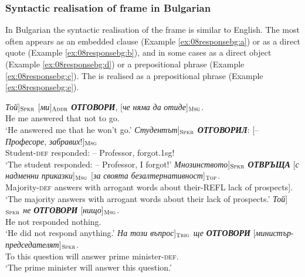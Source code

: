 \documentclass[output=paper,colorlinks,citecolor=brown]{langscibook}
\begin{document}
\subsubsection{Syntactic realisation of  frame in Bulgarian}

In Bulgarian the syntactic realisation of the frame is similar to English. The  most often appears as an embedded clause (Example \ref{ex:08responsebg:a}) or  as a direct quote (Example \ref{ex:08responsebg:b}), and in some cases as a direct object (Example \ref{ex:08responsebg:d}) or a prepositional phrase (Example \ref{ex:08responsebg:c}). The  is realised as a prepositional phrase (Example \ref{ex:08responsebg:e}). %

\begin{exe}
\ex \label{ex:08responsebg}
\begin{xlist} 
\ex \label{ex:08responsebg:a}
\gll {[}\textit{Той}{]}$_{\textsc{Spkr}}$ [\textit{ми}]$_{\textsc{Addr}}$ \textit{\textbf{ОТГОВОРИ}}, [\textit{че} \textit{няма} \textit{да} \textit{отиде}]$_{\textsc{Msg}}$. 
\\
He me answered that not to go. 
\\
\glt `He answered me that he won't go.'
\ex \label{ex:08responsebg:b}
\gll {[}\textit{Студентът}{]}$_{\textsc{Spkr}}$ \textit{\textbf{ОТГОВОРИЛ}}: [-- \textit{Професоре}, \textit{забравих}!]$_{\textsc{Msg}}$
\\
Student-\textsc{def} responded: -- Professor, forgot.1sg!
\\
\glt `The student responded: -- Professor, I forgot!'
\ex \label{ex:08responsebg:c}
\gll {[}\textit{Мнозинството}{]}$_{\textsc{Spkr}}$ \textit{\textbf{ОТВРЪЩА}} [\textit{с} \textit{надменни} \textit{приказки}]$_{\textsc{Msg}}$ [\textit{за} \textit{своята} \textit{безалтернативност}]$_{\textsc{Top}}$.
\\
Majority-\textsc{def} answers with arrogant words about their-REFL {lack of prospects}].
\\
\glt `The majority answers with arrogant words about their lack of prospects.'
\ex \label{ex:08responsebg:d}
\gll {[}\textit{Той}{]}$_{\textsc{Spkr}}$ \textit{не} \textit{\textbf{ОТГОВОРИ}} [\textit{нищо}]$_{\textsc{Msg}}$. 
\\
He not responded nothing. 
\\
\glt `He did not respond anything.'
\ex \label{ex:08responsebg:e}
\gll {[}\textit{На} \textit{този} \textit{въпрос}{]}$_{\textsc{Trig}}$ \textit{ще} \textit{\textbf{ОТГОВОРИ}} [\textit{министър}-\textit{председателят}]$_{\textsc{Spkr}}$. 
\\
To this question will answer {prime minister}-\textsc{def}.
\\
\glt `The prime minister will answer this question.'
\end{xlist}
\end{exe}
\end{document}
